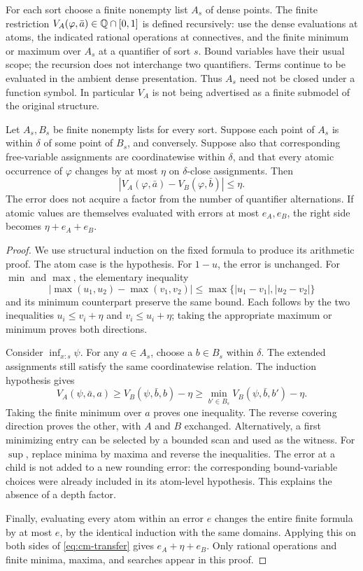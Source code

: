 For each sort choose a finite nonempty list $A_s$ of dense points.  The finite
restriction $V_A(\varphi,\bar a)\in\mathbb Q\cap[0,1]$ is defined recursively:
use the dense evaluations at atoms, the indicated rational operations at
connectives, and the finite minimum or maximum over $A_s$ at a quantifier of
sort $s$.  Bound variables have their usual scope; the recursion does not
interchange two quantifiers.  Terms continue to be evaluated in the ambient
dense presentation.  Thus $A_s$ need not be closed under a function symbol.
In particular $V_A$ is not being advertised as a finite submodel of the
original structure.

\begin{theorem}
\label{thm:cm-backforth}
Let $A_s,B_s$ be finite nonempty lists for every sort.  Suppose each point of
$A_s$ is within $\delta$ of some point of $B_s$, and conversely.  Suppose
also that corresponding free-variable assignments are coordinatewise within
$\delta$, and that every atomic occurrence of $\varphi$ changes by at most
$\eta$ on $\delta$-close assignments.  Then
\[
                |V_A(\varphi,\bar a)-V_B(\varphi,\bar b)|\leq\eta.
\tag{M2}\label{eq:cm-transfer}
\]
The error does not acquire a factor from the number of quantifier alternations.
If atomic values are themselves evaluated with errors at most $e_A,e_B$, the
right side becomes $\eta+e_A+e_B$.
\end{theorem}

\begin{proof}
We use structural induction on the fixed formula to produce its arithmetic
proof.  The atom case is the hypothesis.  For $1-u$, the error is unchanged.
For $\min$ and $\max$, the elementary inequality
\[
 |\max(u_1,u_2)-\max(v_1,v_2)|
 \leq\max\{|u_1-v_1|,|u_2-v_2|\}
\]
and its minimum counterpart preserve the same bound.  Each follows by the
two inequalities $u_i\leq v_i+\eta$ and $v_i\leq u_i+\eta$; taking the
appropriate maximum or minimum proves both directions.

Consider $\inf_{x:s}\psi$.  For any $a\in A_s$, choose a $b\in B_s$
within $\delta$.  The extended assignments still satisfy the same
coordinatewise relation.  The induction hypothesis gives
\[
 V_A(\psi,\bar a,a)\geq V_B(\psi,\bar b,b)-\eta
             \geq\min_{b'\in B_s}V_B(\psi,\bar b,b')-\eta.
\]
Taking the finite minimum over $a$ proves one inequality.  The reverse
covering direction proves the other, with $A$ and $B$ exchanged.  Alternatively,
a first minimizing entry can be selected by a bounded scan and used as the
witness.  For $\sup$, replace minima by maxima and reverse the inequalities.
The error at a child is not added to a new rounding error: the corresponding
bound-variable choices were already included in its atom-level hypothesis.
This explains the absence of a depth factor.

Finally, evaluating every atom within an error $e$ changes the entire finite
formula by at most $e$, by the identical induction with the same domains.
Applying this on both sides of \eqref{eq:cm-transfer} gives
$e_A+\eta+e_B$.  Only rational operations and finite minima, maxima, and
searches appear in this proof.
\end{proof}

